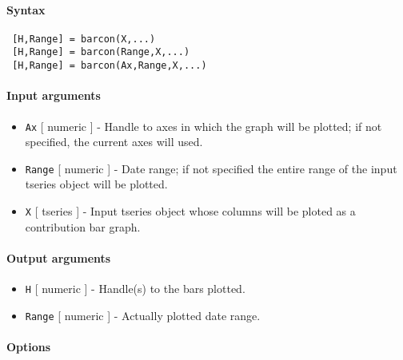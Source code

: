 


	\paragraph{Syntax}
 
 \begin{verbatim}
 [H,Range] = barcon(X,...)
 [H,Range] = barcon(Range,X,...)
 [H,Range] = barcon(Ax,Range,X,...)
 \end{verbatim}
 
 \paragraph{Input arguments}
 
 \begin{itemize}
 \item
   \texttt{Ax} {[} numeric {]} - Handle to axes in which the graph will
   be plotted; if not specified, the current axes will used.
 \item
   \texttt{Range} {[} numeric {]} - Date range; if not specified the
   entire range of the input tseries object will be plotted.
 \item
   \texttt{X} {[} tseries {]} - Input tseries object whose columns will
   be ploted as a contribution bar graph.
 \end{itemize}
 
 \paragraph{Output arguments}
 
 \begin{itemize}
 \item
   \texttt{H} {[} numeric {]} - Handle(s) to the bars plotted.
 \item
   \texttt{Range} {[} numeric {]} - Actually plotted date range.
 \end{itemize}
 
 \paragraph{Options}
 

